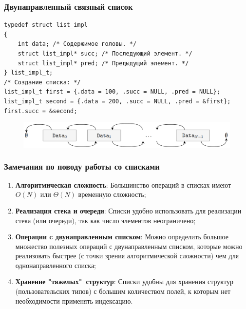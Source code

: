 \documentclass{beamer}
\begin{document}
    \begin{frame}[fragile]
        \frametitle{Двунаправленный связный список}
        \justifying
        \begin{verbatim}
typedef struct list_impl 
{
    int data; /* Содержимое головы. */
    struct list_impl* succ; /* Последующий элемент. */
    struct list_impl* pred; /* Предыдущий элемент. */
} list_impl_t;
/* Создание списка: */
list_impl_t first = {.data = 100, .succ = NULL, .pred = NULL};
list_impl_t second = {.data = 200, .succ = NULL, .pred = &first};
first.succ = &second;
        \end{verbatim}
        \begin{figure}[!tbp]
           \centering
           \includegraphics[width=\textwidth]{pics/list.png}
        \end{figure}
    \end{frame}
    \begin{frame}[fragile]
        \frametitle{Замечания по поводу работы со списками}
        \begin{enumerate}
            \justifying
            \item {\bf Алгоритмическая сложность}: Большинство операций в списках имеют $O(N)$ или $\Theta(N)$ временную сложность;
            \item {\bf Реализация стека и очереди}: Списки удобно использовать для реализации стека (или очереди), так как число элементов неограничено;
            \item {\bf Операции c двунаправленным списком}: Можно определить большое множество полезных операций с двунаправленным списком, которые можно реализовать быстрее (с точки зрения алгоритмической сложности) чем для однонаправленного списка;
            \item {\bf Хранение "тяжелых"\ структур}: Списки удобны для хранения структур (пользовательских типов) с большим количеством полей, к которым нет необходимости применять индексацию.
        \end{enumerate}
    \end{frame}
\end{document}
